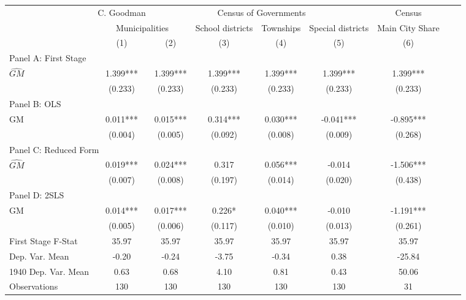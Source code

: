  \begin{tabular}{l*{8}{c}} \toprule
&\multicolumn{1}{c}{C. Goodman}&\multicolumn{4}{c}{Census of Governments}&\multicolumn{1}{c}{Census}\\\cmidrule(lr){2-2}\cmidrule(lr){3-6}\cmidrule(lr){7-7}
&\multicolumn{2}{c}{Municipalities}&\multicolumn{1}{c}{School districts}&\multicolumn{1}{c}{Townships}&\multicolumn{1}{c}{Special districts}&\multicolumn{1}{c}{Main City Share}\\\cmidrule(lr){2-3}\cmidrule(lr){4-6}\cmidrule(lr){7-7}
&\multicolumn{1}{c}{(1)}&\multicolumn{1}{c}{(2)}&\multicolumn{1}{c}{(3)}&\multicolumn{1}{c}{(4)}&\multicolumn{1}{c}{(5)}&\multicolumn{1}{c}{(6)}\\
\cmidrule(lr){1-7}
\multicolumn{6}{l}{Panel A: First Stage}\\
\cmidrule(lr){1-7}
$\widehat{GM}$  &    1.399***&    1.399***&    1.399***&    1.399***&    1.399***&    1.399***\\
                &  (0.233)   &  (0.233)   &  (0.233)   &  (0.233)   &  (0.233)   &  (0.233)   \\
\cmidrule(lr){1-7}
\multicolumn{6}{l}{Panel B: OLS}\\
\cmidrule(lr){1-7}
GM              &    0.011***&    0.015***&    0.314***&    0.030***&   -0.041***&   -0.895***\\
                &  (0.004)   &  (0.005)   &  (0.092)   &  (0.008)   &  (0.009)   &  (0.268)   \\
\cmidrule(lr){1-7}
\multicolumn{6}{l}{Panel C: Reduced Form}\\
\cmidrule(lr){1-7}
$\widehat{GM}$  &    0.019***&    0.024***&    0.317   &    0.056***&   -0.014   &   -1.506***\\
                &  (0.007)   &  (0.008)   &  (0.197)   &  (0.014)   &  (0.020)   &  (0.438)   \\
\cmidrule(lr){1-7}
\multicolumn{6}{l}{Panel D: 2SLS}\\
\cmidrule(lr){1-7}
GM              &    0.014***&    0.017***&    0.226*  &    0.040***&   -0.010   &   -1.191***\\
                &  (0.005)   &  (0.006)   &  (0.117)   &  (0.010)   &  (0.013)   &  (0.261)   \\
\midrule
First Stage F-Stat&    35.97   &    35.97   &    35.97   &    35.97   &    35.97   &    35.97   \\
Dep. Var. Mean  &    -0.20   &    -0.24   &    -3.75   &    -0.34   &     0.38   &   -25.84   \\
1940 Dep. Var. Mean&     0.63   &     0.68   &     4.10   &     0.81   &     0.43   &    50.06   \\
Observations    &      130   &      130   &      130   &      130   &      130   &       31   \\
       \bottomrule \end{tabular}
